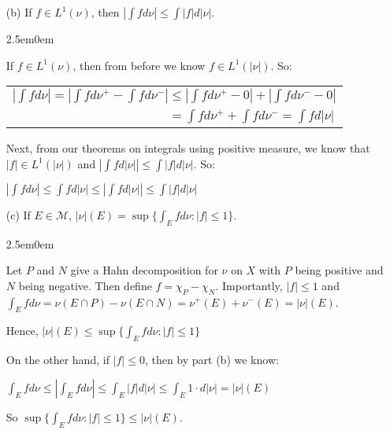 \documentclass{book}
\newcommand{\exTwoP}{%
   \color{RedViolet}%
   \fontsize{13}{15}\selectfont%
}
\newenvironment{myIndent}{%
   \begin{adjustwidth}{2.5em}{0em}%
}{%
   \end{adjustwidth}%
}
\newcommand{\retTwo}{\hfill\bigbreak}
\begin{document}
\begin{enumerate}
\begin{myIndent}
		So $L^1(|\nu|) = L^1(\nu^+) \cap L^1(\nu^-) = L^1(\nu)$ and if $f \in L^1(|\nu|)$, then\\ $\int f d|\nu| = \int f d\nu^+ + \int f d\nu^-$. \retTwo
	\end{myIndent}

	\item[(b)] If $f \in L^1(\nu)$, then $| \int f d\nu | \leq \int |f| d|\nu|$.
	
	\begin{myIndent}\exTwoP
		If $f \in L^1(\nu)$, then from before we know $f \in L^1(|\nu|)$. So:

		{\centering \begin{tabular}{l}
			$|\int f d\nu| = |\int f d\nu^+ - \int f d\nu^-| \leq |\int f d\nu^+ - 0| + |\int f d\nu^- - 0|$\\ [6pt]
			
			$\phantom{|\int f d\nu| = |\int f d\nu^+ - \int f d\nu^-|} = \int f d\nu^+ + \int f d\nu^- = \int f d|\nu|$
		\end{tabular}\retTwo\par}

		Next, from our theorems on integrals using positive measure, we know that $|f| \in L^1(|\nu|)$ and $\left|\int f d|\nu|\right| \leq \int |f| d|\nu|$. So:
		
		{\centering$|\int f d\nu| \leq \int f d|\nu| \leq \left|\int f d|\nu|\right| \leq \int |f| d|\nu|$\retTwo\par}
	\end{myIndent}

	\item[(c)] If $E \in \mathcal{M}$, $|\nu|(E) = \sup\{\int_E f d\nu : |f| \leq 1\}$.  
	
	\begin{myIndent}\exTwoP
		Let $P$ and $N$ give a Hahn decomposition for $\nu$ on $X$ with $P$ being positive and\\ $N$ being negative. Then define $f = \chi_P - \chi_N$. Importantly, $|f| \leq 1$ and\\ $\int_E fd\nu = \nu(E \cap P) - \nu(E \cap N) = \nu^+(E) + \nu^-(E) = |\nu|(E)$.\retTwo

		Hence, $|\nu|(E) \leq \sup\{\int_E f d\nu : |f| \leq 1\}$\retTwo

		On the other hand, if $|f| \leq 0$, then by part (b) we know:

		{\centering $\int_E f d\nu \leq |\int_E f d\nu| \leq \int_E |f|d|\nu| \leq \int_E 1\cdot d|\nu| = |\nu|(E)$ \retTwo\par}

		So $\sup\{\int_E f d\nu : |f| \leq 1\} \leq |\nu|(E)$.\retTwo
	\end{myIndent}
\end{enumerate}
\end{document}
